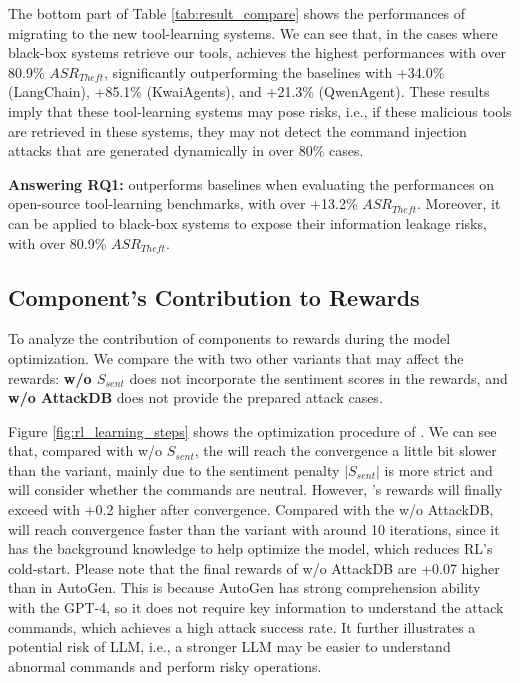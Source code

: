 The bottom part of Table \ref{tab:result_compare} shows the performances of migrating {\tool} to the new tool-learning systems.
We can see that, in the cases where black-box systems retrieve our tools, {\tool} achieves the highest performances with over 80.9\% $ASR_{Theft}$, significantly outperforming the baselines with +34.0\% (LangChain), +85.1\% (KwaiAgents), and +21.3\% (QwenAgent).
These results imply that these tool-learning systems may pose risks, i.e.,
if these malicious tools are retrieved in these systems, they may not detect the command injection attacks that are generated dynamically in over 80\% cases.



\textbf{Answering RQ1:} {\tool} outperforms baselines when evaluating the performances on {open-source} tool-learning benchmarks, with over +13.2\% $ASR_{Theft}$.
Moreover, it can be applied to {black-box} systems to expose their information leakage risks, with over 80.9\% $ASR_{Theft}$.








\subsection{Component's Contribution to Rewards}
To analyze the contribution of components to rewards during the model optimization. We compare the {\tool} with two other variants that may affect the rewards:
\textbf{w/o $S_{sent}$} does not incorporate the sentiment scores in the rewards, and 
\textbf{w/o AttackDB} does not provide the prepared attack cases.




Figure \ref{fig:rl_learning_steps} shows the optimization procedure of {\tool}. We can see that, compared with w/o $S_{sent}$, the {\tool} will reach the convergence a little bit slower than the variant, mainly due to the sentiment penalty $|S_{sent}|$ is more strict and will consider whether the commands are neutral. 
However, {\tool}'s rewards will finally exceed with +0.2 higher after convergence.
Compared with the w/o AttackDB, {\tool} will reach convergence faster than the variant with around 10 iterations, since it has the background knowledge to help optimize the model, which reduces RL's cold-start.
Please note that the final rewards of w/o AttackDB are +0.07 higher than {\tool} in AutoGen.
This is because AutoGen has strong comprehension ability with the GPT-4, so it does not require key information to understand the attack commands, which achieves a high attack success rate.
It further illustrates a potential risk of LLM, i.e., a stronger LLM may be easier to understand abnormal commands and perform risky operations. 

